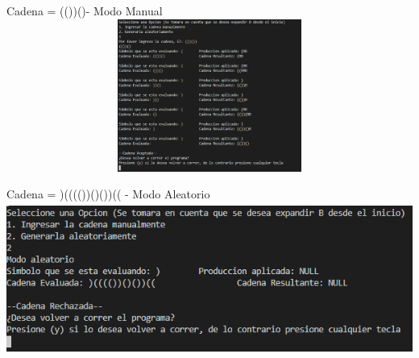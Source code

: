 \documentclass[a4paper]{report}
\begin{document}
\begin{flushleft}
Cadena  = (())()- Modo Manual
\includegraphics[width= 15cm, height= 5cm]{p7-2.png}

Cadena  = )(((())()())((  - Modo Aleatorio
\includegraphics[width= 15cm, height= 5cm]{p7-3.png}

\end{flushleft}
\end{document}
